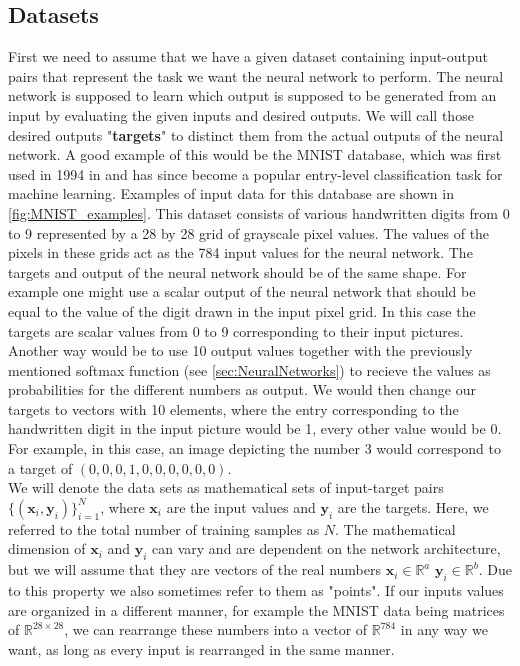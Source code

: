 \subsection{Datasets}
First we need to assume that we have a given dataset containing input-output pairs that represent the task we want the neural network to perform. The neural network is supposed to learn which output is supposed to be generated from an input by evaluating the given inputs and desired outputs. We will call those desired outputs "\textbf{targets}" to distinct them from the actual outputs of the neural network. A good example of this would be the MNIST database, which was first used in 1994 in \cite{firstMNISTpaper} and has since become a popular entry-level classification task for machine learning. Examples of input data for this database are shown in \cref{fig:MNIST_examples}. 
This dataset consists of various handwritten digits from 0 to 9 represented by a 28 by 28 grid of grayscale pixel values. The values of the pixels in these grids act as the 784 input values for the neural network. The targets and output of the neural network should be of the same shape. For example one might use a scalar output of the neural network that should be equal to the value of the digit drawn in the input pixel grid. In this case the targets are scalar values from 0 to 9 corresponding to their input pictures. Another way would be to use 10 output values together with the previously mentioned softmax function (see \cref{sec:NeuralNetworks}) to recieve the values as probabilities for the different numbers as output. We would then change our targets to vectors with 10 elements, where the entry corresponding to the handwritten digit in the input picture would be 1, every other value would be 0. For example, in this case, an image depicting the number 3 would correspond to a target of $(0,0,0,1,0,0,0,0,0,0)$.\\
We will denote the data sets as mathematical sets of input-target pairs $\{(\mathbf{x}_i, \mathbf{y}_i)\}_{i=1}^N$, where $\mathbf{x}_i$ are the input values and $\mathbf{y}_i$ are the targets. Here, we referred to the total number of training samples as $N$. The mathematical dimension of $\mathbf{x}_i$ and $\mathbf{y}_i$ can vary and are dependent on the network architecture, but we will assume that they are vectors of the real numbers $\mathbf{x}_i \in \mathbb{R}^a$ $\mathbf{y}_i \in \mathbb{R}^b$. Due to this property we also sometimes refer to them as "points". If our inputs values are organized in a different manner, for example the MNIST data being matrices of $\mathbb{R}^{28\times28}$, we can rearrange these numbers into a vector of $\mathbb{R}^{784}$ in any way we want, as long as every input is rearranged in the same manner.\\
